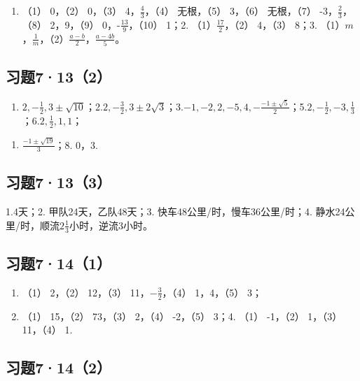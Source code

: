 \begin{enumerate}
\item
  （1） 0，（2） 0，（3） 4，\(\frac{4}{3}\)，（4） 无根，（5） 3，（6）
  无根，（7） -3，\(\frac{2}{3}\)，（8） 2，9，（9）
  0，-\(\frac{13}{9}\)，（10） 1；2. （1）\(\frac{17}{2}\)，（2）
  4，（3） 8；3.
  （1）\(m\)，\(\frac{1}{m}\)，（2）\(\frac{a-b}{2}\)，\(\frac{a-4b}{5}\)。
\end{enumerate}

\subsection{习题7·13（2）}

\begin{enumerate}[start=1]
\item
  \(2, -\frac{1}{2}, 3 \pm \sqrt{10}\)；2.\(2, -\frac{3}{2}, 3 \pm 2\sqrt{3}\)；3.\(-1, -2, 2, -5, 4, -\frac{-1 \pm \sqrt{5}}{2}\)；5.\(2, -\frac{1}{2}, -3, \frac{1}{3}\)；6.\(2, \frac{1}{2}, 1, 1\)；
\end{enumerate}

\begin{enumerate}[start=7]
\item
  \(\frac{-1\pm\sqrt{19}}{3}\)；8. 0，3.
\end{enumerate}

\subsection{习题7·13（3）}

1.4天；2. 甲队24天，乙队48天；3. 快车48公里/时，慢车36公里/时；4.
静水24公里/时，顺流\(2\frac{1}{3}\)小时，逆流3小时。

\subsection{习题7·14（1）}

\begin{enumerate}[start=2]
\item
  （1） 2，（2） 12，（3） 11，\(-\frac{3}{2}\)，（4） 1，4，（5） 3；
\item
  （1） 15，（2） 73，（3） 2，（4） -2，（5） 3；4. （1） -1，（2）
  1，（3） 11，（4） 1.
\end{enumerate}

\subsection{习题7·14（2）}

